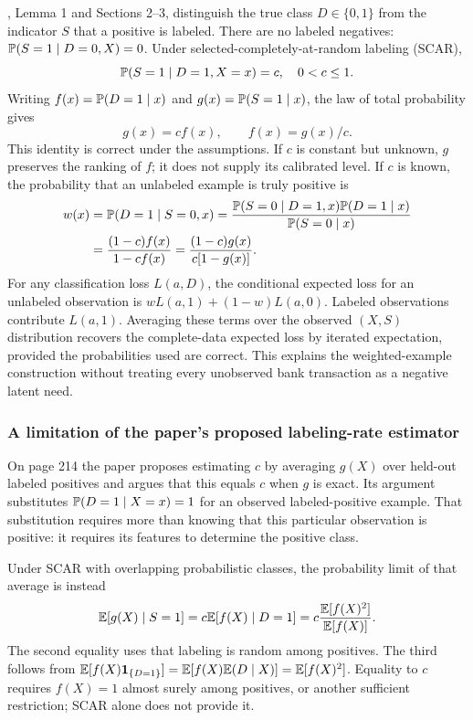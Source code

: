 \citet{elkan2008pu}, Lemma 1 and Sections 2--3, distinguish the true class $D\in\{0,1\}$ from the indicator $S$ that a positive is labeled. There are no labeled negatives: $\mathbb{P}(S=1\mid D=0,X)=0$. Under selected-completely-at-random labeling (SCAR),
\[
 \mathbb{P}(S=1\mid D=1,X=x)=c,\quad 0<c\le1.
\]
Writing $f(x)=\mathbb{P}(D=1\mid x)$ and $g(x)=\mathbb{P}(S=1\mid x)$, the law of total probability gives
\begin{equation}
 g(x)=c f(x),\qquad f(x)=g(x)/c.
 \label{eq:pu-lemma}
\end{equation}
This identity is correct under the assumptions. If $c$ is constant but unknown, $g$ preserves the ranking of $f$; it does not supply its calibrated level. If $c$ is known, the probability that an unlabeled example is truly positive is
\begin{align}
 w(x)&=\mathbb{P}(D=1\mid S=0,x)
 =\frac{\mathbb{P}(S=0\mid D=1,x)\mathbb{P}(D=1\mid x)}{\mathbb{P}(S=0\mid x)}\nonumber\\
 &=\frac{(1-c)f(x)}{1-cf(x)}
 =\frac{(1-c)g(x)}{c[1-g(x)]}.
 \label{eq:pu-weight}
\end{align}
For any classification loss $L(a,D)$, the conditional expected loss for an unlabeled observation is $wL(a,1)+(1-w)L(a,0)$. Labeled observations contribute $L(a,1)$. Averaging these terms over the observed $(X,S)$ distribution recovers the complete-data expected loss by iterated expectation, provided the probabilities used are correct. This explains the weighted-example construction without treating every unobserved bank transaction as a negative latent need.

\subsubsection{A limitation of the paper's proposed labeling-rate estimator}

On page 214 the paper proposes estimating $c$ by averaging $g(X)$ over held-out labeled positives and argues that this equals $c$ when $g$ is exact. Its argument substitutes $\mathbb{P}(D=1\mid X=x)=1$ for an observed labeled-positive example. That substitution requires more than knowing that this particular observation is positive: it requires its features to determine the positive class.

Under SCAR with overlapping probabilistic classes, the probability limit of that average is instead
\begin{equation}
 \mathbb{E}[g(X)\mid S=1]
 =c\mathbb{E}[f(X)\mid D=1]
 =c\frac{\mathbb{E}[f(X)^2]}{\mathbb{E}[f(X)]}.
 \label{eq:pu-c-limit}
\end{equation}
The second equality uses that labeling is random among positives. The third follows from $\mathbb{E}[f(X)\mathbf1_{\{D=1\}}]=\mathbb{E}[f(X)\mathbb{E}(D\mid X)]=\mathbb{E}[f(X)^2]$. Equality to $c$ requires $f(X)=1$ almost surely among positives, or another sufficient restriction; SCAR alone does not provide it.

